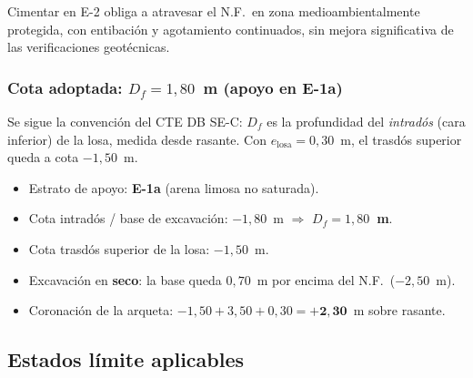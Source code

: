 \begin{notabox}[Hipótesis Df = 4{,}0 m en E-2 --- descartada]
  Cimentar en E-2 obliga a atravesar el N.F.\ en zona medioambientalmente
  protegida, con entibación y agotamiento continuados, sin mejora significativa
  de las verificaciones geotécnicas.
\end{notabox}

\subsubsection*{Cota adoptada: $D_f=1{,}80$~m (apoyo en E-1a)}

Se sigue la convención del CTE DB SE-C: $D_f$ es la profundidad del
\emph{intradós} (cara inferior) de la losa, medida desde rasante.
Con $e_\text{losa}=0{,}30$~m, el trasdós superior queda a cota $-1{,}50$~m.

\begin{supuestobox}
  \begin{itemize}
    \item Estrato de apoyo: \textbf{E-1a} (arena limosa no saturada).
    \item Cota intradós / base de excavación: $-1{,}80$~m
          $\Rightarrow$ \textbf{$D_f=1{,}80$~m}.
    \item Cota trasdós superior de la losa: $-1{,}50$~m.
    \item Excavación en \textbf{seco}: la base queda $0{,}70$~m por encima
          del N.F.\ ($-2{,}50$~m).
    \item Coronación de la arqueta:
          $-1{,}50 + 3{,}50 + 0{,}30 = \mathbf{+2{,}30}$~m sobre rasante.
  \end{itemize}
\end{supuestobox}

\subsection{Estados límite aplicables}
\label{subsec:estados_limite_arqueta}

